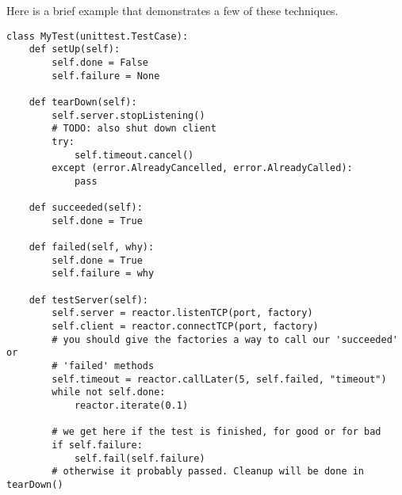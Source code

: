 Here is a brief example that demonstrates a few of these techniques.\begin{verbatim}
class MyTest(unittest.TestCase):
    def setUp(self):
        self.done = False
        self.failure = None

    def tearDown(self):
        self.server.stopListening()
        # TODO: also shut down client
        try:
            self.timeout.cancel()
        except (error.AlreadyCancelled, error.AlreadyCalled):
            pass

    def succeeded(self):
        self.done = True

    def failed(self, why):
        self.done = True
        self.failure = why

    def testServer(self):
        self.server = reactor.listenTCP(port, factory)
        self.client = reactor.connectTCP(port, factory)
        # you should give the factories a way to call our 'succeeded' or
        # 'failed' methods
        self.timeout = reactor.callLater(5, self.failed, "timeout")
        while not self.done:
            reactor.iterate(0.1)

        # we get here if the test is finished, for good or for bad
        if self.failure:
            self.fail(self.failure)
        # otherwise it probably passed. Cleanup will be done in tearDown()
\end{verbatim}


